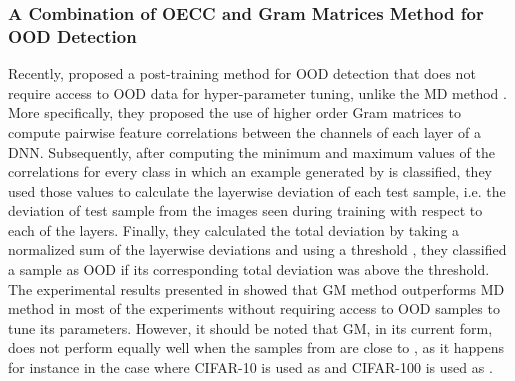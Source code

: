 \documentclass{article} \usepackage{iclr2020_conference,times}
\begin{document}
\subsubsection{A Combination of OECC and Gram Matrices Method for OOD Detection}
Recently, \citet{ch2019detecting} proposed a post-training method for OOD detection that does not require access to OOD data for hyper-parameter tuning, unlike the MD method \citep{Lee:2018:SUF:3327757.3327819}. More specifically, they proposed the use of higher order Gram matrices to compute pairwise feature correlations between the channels of each layer of a DNN. Subsequently, after computing the minimum and maximum values of the correlations for every class  in which an example generated by  is classified, they used those values to calculate the layerwise deviation of each test sample, i.e. the deviation of test sample from the images seen during training with respect to each of the layers. Finally, they calculated the total deviation by taking a normalized sum of the layerwise deviations and using a threshold , they classified a sample as OOD if its corresponding total deviation was above the threshold. The experimental results presented in \citet{ch2019detecting} showed that GM method outperforms MD method in most of the experiments without requiring access to OOD samples to tune its parameters. However, it should be noted that GM, in its current form, does not perform equally well when the samples from  are close to , as it happens for instance in the case where CIFAR-10 is used as  and CIFAR-100 is used as .
\end{document}
